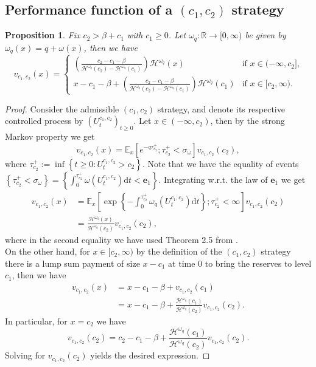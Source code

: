 \documentclass[10pt,a4paper]{amsart}
\newtheorem{proposition}{Proposition}[section]
\newcommand{\e}{\mathbb{E}}
\newcommand{\reals}{\mathbb{R}}
\newcommand{\diff}{\mathrm{d}}
\newcommand{\cH}{\mathcal{H}}
\newcommand{\homega}{\omega_q}
\newcommand{\BRA}[1]{{{\left\{#1\right\}}}} %
\newcommand{\PAR}[1]{{{\left(#1\right)}}} %
\newcommand{\SBRA}[1]{{{\left[#1\right]}}} %
\renewcommand{\geq}{\geqslant}
\begin{document}
\subsection{Performance function of a $(c_1,c_2)$ strategy}
\begin{proposition}\label{prop:perf-barrier}
	Fix $c_2 > \beta + c_1 $ with $c_1\geq 0$. Let $\homega : \reals \to [0,\infty)$ be given by $\homega(x) = q + \omega(x)$, then we have
	\[
	v_{c_1,c_2} (x) =
	\begin{cases}
		\PAR{\frac{c_2-c_1-\beta}{\cH^{\homega}(c_2) - \cH^{\homega}(c_1)}} \cH^{\homega}(x) & \text{if $x \in (-\infty,c_2]$,} \\
		x-c_1-\beta + \PAR{\frac{c_2-c_1-\beta}{\cH^{\homega}(c_2) - \cH^{\homega}(c_1)}} \cH^{\homega}(c_1) & \text{if $x \in [c_2, \infty)$.}
	\end{cases}
	\]
\end{proposition}
\begin{proof}
Consider the admissible $(c_1,c_2)$ strategy, and denote its respective controlled process by $(U^{c_1,c_2}_t)_{t\geq 0}$. Let $x \in (-\infty,c_2)$, then by the strong Markov property we get
\[
v_{c_1,c_2}(x) = \e_x\SBRA{e^{-q\tau_{c_2}^+} ; \tau_{c_2}^+ < \sigma_{\omega}}v_{c_1,c_2}(c_2),
\]
where $\tau_{c_2}^+ := \inf\BRA{t\geq 0: U^{c_1,c_2}_t > c_2}$. Note that we have the equality of events $\BRA{ \tau_{c_2}^+ < \sigma_{\omega} } = \BRA{ \int_0^{\tau_{c_2}^+} \omega(U^{c_1,c_2}_t) \diff t < \mathbf{e}_1}$. Integrating w.r.t. the law of $\mathbf{e}_1$ we get
\begin{align*}
	v_{c_1,c_2}(x) &= \e_x\SBRA{ \exp\BRA{-\int_0^{\tau_{c_2}^+} \homega(U^{c_1,c_2}_t) \diff t} ; \tau_{c_2}^+ < \infty }v_{c_1,c_2}(c_2)\\
	&= \frac{\cH^{\homega}(x)}{\cH^{\homega}(c_2)}v_{c_1,c_2}(c_2),
\end{align*}
where in the second equality we have used Theorem 2.5 from \cite{li-palmowski_2018}.\\
On the other hand, for $x \in [c_2,\infty)$ by the definition of the $(c_1,c_2)$ strategy there is a lump sum payment of size $x-c_1$ at time 0 to bring the reserves to level $c_1$, then we have
\begin{align*}
v_{c_1,c_2}(x) &= x - c_1 -\beta + v_{c_1,c_2}(c_1)\\
&= x - c_1 - \beta + \frac{\cH^{\homega}(c_1)}{\cH^{\homega}(c_2)}v_{c_1,c_2}(c_2).
\end{align*}
In particular, for $x = c_2$ we have
\[
v_{c_1,c_2}(c_2) = c_2-c_1-\beta + \frac{\cH^{\homega}(c_1)}{\cH^{\homega}(c_2)}v_{c_1,c_2}(c_2).
\]
Solving for $v_{c_1,c_2}(c_2)$ yields the desired expression.
\end{proof}
\end{document}
